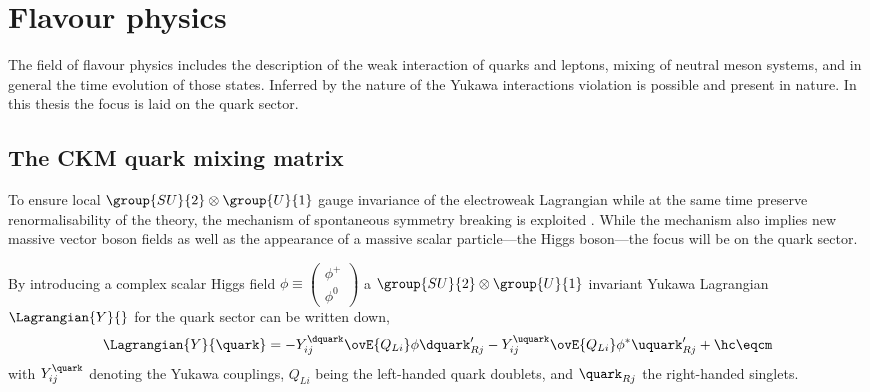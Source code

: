 
\section{Flavour physics}
\label{sec:cpv_theory:flavour_physics}

The field of flavour physics includes the description of the weak interaction of
quarks and leptons, mixing of neutral meson systems, and in general the time
evolution of those states. Inferred by the nature of the Yukawa interactions \CP
violation is possible and present in nature. In this thesis the focus is laid on
the quark sector.

\subsection{The \acs{CKM} quark mixing matrix}
\label{sec:cpv_theory:flavour_physics:ckm_matrix}

To ensure local $\group{SU}{2}\otimes\group{U}{1}$ gauge invariance of the
electroweak Lagrangian while at the same time preserve renormalisability of the
theory, the mechanism of spontaneous symmetry breaking is exploited
\cite{set:higgs}. While the mechanism also implies new massive vector boson
fields as well as the appearance of a massive scalar particle---the Higgs
boson---the focus will be on the quark sector.

By introducing a complex scalar Higgs field $\phi \equiv
\left(\begin{smallmatrix} \phi ^{+} \\ \phi^{0}\end{smallmatrix}\right)$ a
$\group{SU}{2}\otimes\group{U}{1}$ invariant Yukawa Lagrangian
$\Lagrangian{Y}{}$ for the quark sector can be written down,
%
\begin{equation}\label{sec:cpv_theory:flavour_physics:ckm_matrix:yukawa_lagrangian}
  \Lagrangian{Y}{\quark} = -Y_{ij}^{\dquark} \ovE{Q_{Li}} \phi \dquark_{Rj}^{\prime} - Y_{ij}^{\uquark} \ovE{Q_{Li}} \phi^{\ast} \uquark_{Rj}^{\prime} + \hc \eqcm
\end{equation}
%
with $Y_{ij}^{\quark}$ denoting the Yukawa couplings, $Q_{Li}$ being the
left-handed quark doublets, and $\quark_{Rj}$ the right-handed singlets. 

